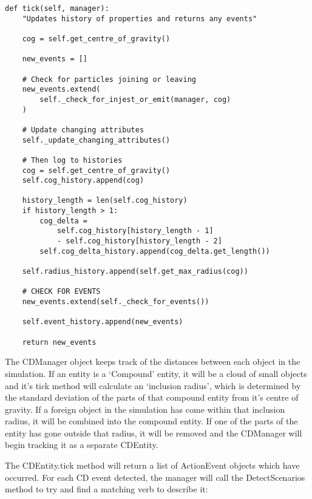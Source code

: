 \documentclass[dissertation.tex]{subfiles}
\begin{document}
\begin{lstlisting}[frame=single,caption={CDEntity.tick method}]
def tick(self, manager):
    "Updates history of properties and returns any events"

    cog = self.get_centre_of_gravity()

    new_events = []

    # Check for particles joining or leaving
    new_events.extend(
        self._check_for_injest_or_emit(manager, cog)
    )

    # Update changing attributes
    self._update_changing_attributes()

    # Then log to histories
    cog = self.get_centre_of_gravity()
    self.cog_history.append(cog)

    history_length = len(self.cog_history)
    if history_length > 1:
        cog_delta =
            self.cog_history[history_length - 1]
            - self.cog_history[history_length - 2]
        self.cog_delta_history.append(cog_delta.get_length())

    self.radius_history.append(self.get_max_radius(cog))

    # CHECK FOR EVENTS
    new_events.extend(self._check_for_events())

    self.event_history.append(new_events)

    return new_events
\end{lstlisting}
    The CDManager object keeps track of the distances between each object in the simulation. If an entity is a `Compound' entity, it will be a cloud of small objects and it's tick method will calculate an `inclusion radius', which is determined by the standard deviation of the parts of that compound entity from it's centre of gravity. If a foreign object in the simulation has come within that inclusion radius, it will be combined into the compound entity. If one of the parts of the entity has gone outside that radius, it will be removed and the CDManager will begin tracking it as a separate CDEntity.

    The CDEntity.tick method will return a list of ActionEvent objects which have occurred. For each CD event detected, the manager will call the DetectScenarios method to try and find a matching verb to describe it:
\end{document}
